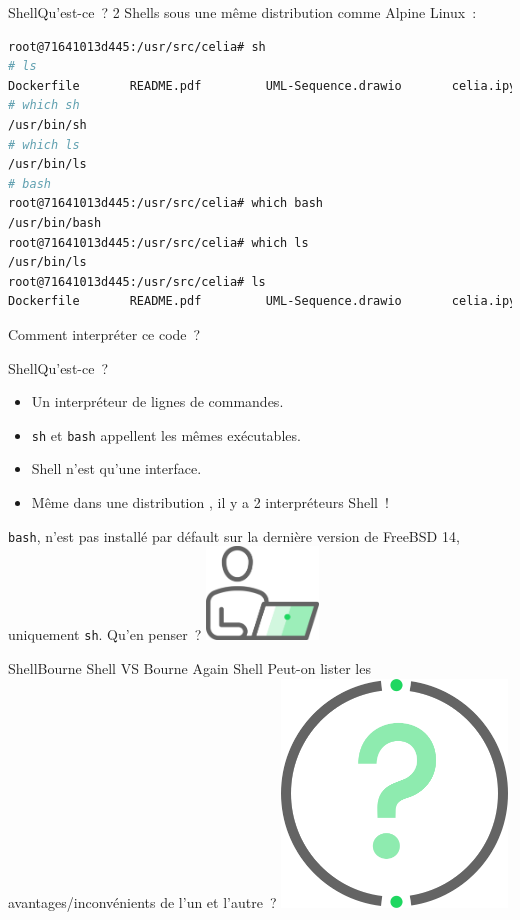 \documentclass{beamer}
\begin{document}
    \begin{frame}[fragile]{Shell}{Qu'est-ce~?}
        2 Shells sous une même distribution  comme Alpine Linux~:
        \begin{lstlisting}[language=bash]
root@71641013d445:/usr/src/celia# sh
# ls
Dockerfile       README.pdf         UML-Sequence.drawio       celia.ipynb
# which sh
/usr/bin/sh
# which ls
/usr/bin/ls
# bash
root@71641013d445:/usr/src/celia# which bash
/usr/bin/bash
root@71641013d445:/usr/src/celia# which ls
/usr/bin/ls
root@71641013d445:/usr/src/celia# ls
Dockerfile       README.pdf         UML-Sequence.drawio       celia.ipynb
        \end{lstlisting}
        \bigbreak
        Comment interpréter ce code~?
    \end{frame}

    \begin{frame}{Shell}{Qu'est-ce~?}
        \begin{itemize}
            \item Un interpréteur de lignes de commandes.
            \item \lstinline{sh} et \lstinline{bash} appellent les mêmes exécutables.
            \item Shell n'est qu'une interface.
            \item Même dans une distribution , il y a 2 interpréteurs Shell~!
        \end{itemize}
        \bigbreak
        \lstinline{bash}, n'est pas installé par défault sur la dernière version de FreeBSD 14, uniquement \lstinline{sh}.
        Qu'en penser~?
        \bigbreak
        \centering
        \includegraphics[width=3cm]{image/guy-in-front-of-desktop}
    \end{frame}

    \begin{frame}{Shell}{Bourne Shell VS Bourne Again Shell}
        Peut-on lister les avantages/inconvénients de l'un et l'autre~?
        \bigbreak
        \centering
        \includegraphics[width=6cm]{image/question-mark}
    \end{frame}
\end{document}
